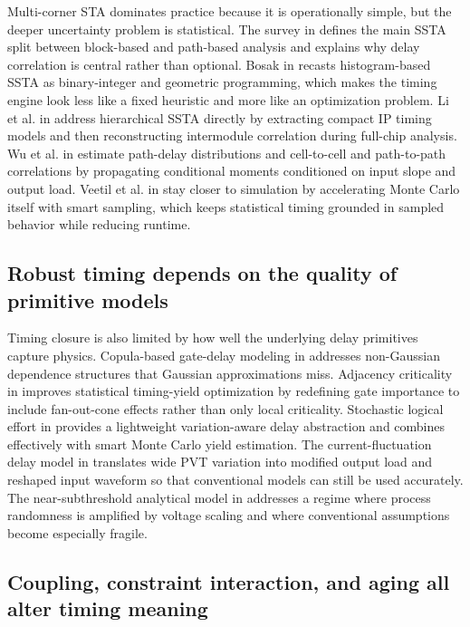 \documentclass[num-refs]{wiley-article}
\begin{document}
  Multi-corner STA dominates practice because it is operationally simple, but the deeper uncertainty problem is statistical. The survey in \cite{ref49} defines the main SSTA split between block-based and path-based analysis and explains why delay correlation is central rather than optional. Bosak in \cite{ref18} recasts histogram-based SSTA as binary-integer and geometric programming, which makes the timing engine look less like a fixed heuristic and more like an optimization problem. Li et al. in \cite{ref43} address hierarchical SSTA directly by extracting compact IP timing models and then reconstructing intermodule correlation during full-chip analysis. Wu et al. in \cite{ref45} estimate path-delay distributions and cell-to-cell and path-to-path correlations by propagating conditional moments conditioned on input slope and output load. Veetil et al. in \cite{ref47} stay closer to simulation by accelerating Monte Carlo itself with smart sampling, which keeps statistical timing grounded in sampled behavior while reducing runtime.


  \subsection{Robust timing depends on the quality of primitive models}

  Timing closure is also limited by how well the underlying delay primitives capture physics. Copula-based gate-delay modeling in \cite{ref32} addresses non-Gaussian dependence structures that Gaussian approximations miss. Adjacency criticality in \cite{ref35} improves statistical timing-yield optimization by redefining gate importance to include fan-out-cone effects rather than only local criticality. Stochastic logical effort in \cite{ref41} provides a lightweight variation-aware delay abstraction and combines effectively with smart Monte Carlo yield estimation. The current-fluctuation delay model in \cite{ref42} translates wide PVT variation into modified output load and reshaped input waveform so that conventional models can still be used accurately. The near-subthreshold analytical model in \cite{ref36} addresses a regime where process randomness is amplified by voltage scaling and where conventional assumptions become especially fragile.


  \subsection{Coupling, constraint interaction, and aging all alter timing meaning}
\end{document}
